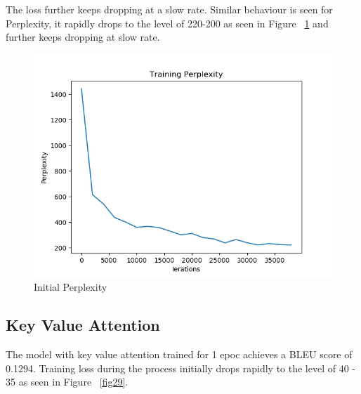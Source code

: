 \documentclass[11pt,a4paper]{article}
\begin{document}
The loss further keeps dropping at a slow rate. Similar behaviour is seen for Perplexity, it rapidly drops to the level of 220-200 as seen in Figure ~\ref{fig27} and further keeps dropping at slow rate.


\begin{figure}[!htbp]
\includegraphics[width=\linewidth]{de_add_ppl_1.png}
\caption{Initial Perplexity}
\label{fig27}
\end{figure}


\pagebreak
\subsection{Key Value Attention}

The model with key value attention trained for 1 epoc achieves a BLEU score of 0.1294.
Training loss during the process initially drops rapidly to the level of 40 - 35 as seen in Figure ~\ref{fig29}. 
\end{document}
